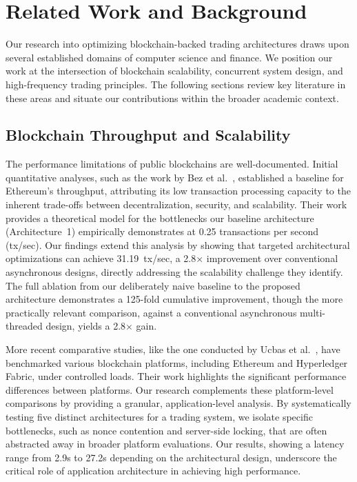 \section{Related Work and Background}
\label{sec:related}

Our research into optimizing blockchain-backed trading architectures draws upon several established domains of computer science and finance. We position our work at the intersection of blockchain scalability, concurrent system design, and high-frequency trading principles. The following sections review key literature in these areas and situate our contributions within the broader academic context.

\subsection{Blockchain Throughput and Scalability}

The performance limitations of public blockchains are well-documented. Initial quantitative analyses, such as the work by Bez et al.~\cite{bez2019scalability}, established a baseline for Ethereum's throughput, attributing its low transaction processing capacity to the inherent trade-offs between decentralization, security, and scalability. Their work provides a theoretical model for the bottlenecks our baseline architecture (Architecture~1) empirically demonstrates at 0.25 transactions per second (tx/sec). Our findings extend this analysis by showing that targeted architectural optimizations can achieve 31.19~tx/sec, a 2.8$\times$ improvement over conventional asynchronous designs, directly addressing the scalability challenge they identify. The full ablation from our deliberately naive baseline to the proposed architecture demonstrates a 125-fold cumulative improvement, though the more practically relevant comparison, against a conventional asynchronous multi-threaded design, yields a 2.8$\times$ gain.

More recent comparative studies, like the one conducted by Ucbas et al.~\cite{ucbas2023performance}, have benchmarked various blockchain platforms, including Ethereum and Hyperledger Fabric, under controlled loads. Their work highlights the significant performance differences between platforms. Our research complements these platform-level comparisons by providing a granular, application-level analysis. By systematically testing five distinct architectures for a trading system, we isolate specific bottlenecks, such as nonce contention and server-side locking, that are often abstracted away in broader platform evaluations. Our results, showing a latency range from 2.9s to 27.2s depending on the architectural design, underscore the critical role of application architecture in achieving high performance.

